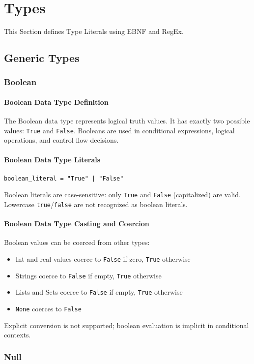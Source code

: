 \chapter{Types}
\label{ch:types}
This Section defines Type Literals using EBNF and RegEx.
\section{Generic Types}
\label{sec:generic-types}
\subsection{Boolean}
\subsubsection{Boolean Data Type Definition}
The Boolean data type represents logical truth values. It has exactly two possible values: \texttt{True} and \texttt{False}. Booleans are used in conditional expressions, logical operations, and control flow decisions.

\subsubsection{Boolean Data Type Literals}
\begin{verbatim}
boolean_literal = "True" | "False"
\end{verbatim}
Boolean literals are case-sensitive: only \texttt{True} and \texttt{False} (capitalized) are valid. Lowercase \texttt{true}/\texttt{false} are not recognized as boolean literals.
\subsubsection{Boolean Data Type Casting and Coercion}
Boolean values can be coerced from other types:
\begin{itemize}
\item Int and real values coerce to \texttt{False} if zero, \texttt{True} otherwise
\item Strings coerce to \texttt{False} if empty, \texttt{True} otherwise
\item Lists and Sets coerce to \texttt{False} if empty, \texttt{True} otherwise
\item \texttt{None} coerces to \texttt{False}
\end{itemize}
Explicit conversion is not supported; boolean evaluation is implicit in conditional contexts.
\subsection{Null}
